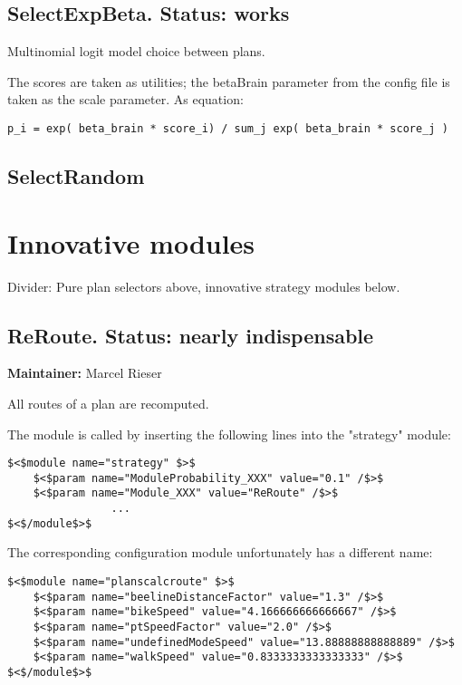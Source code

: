 \documentclass[a4paper,11pt]{report}
\begin{document}
\subsection{SelectExpBeta. Status: works}

Multinomial logit model choice between plans.

The scores are taken as utilities; the betaBrain parameter from the  config file is taken as the scale parameter. As equation:
\begin{verbatim}
p_i = exp( beta_brain * score_i) / sum_j exp( beta_brain * score_j )
\end{verbatim}

\subsection{SelectRandom}

\vfill\eject
\section{Innovative modules}


Divider: Pure plan selectors above, innovative strategy modules below.

\subsection{ReRoute.  Status: nearly indispensable}

\textbf{Maintainer:} Marcel Rieser

All routes of a plan are recomputed.

The module is called by inserting the following lines into the "strategy" module:
\begin{verbatim}
$<$module name="strategy" $>$
	$<$param name="ModuleProbability_XXX" value="0.1" /$>$
	$<$param name="Module_XXX" value="ReRoute" /$>$
                ...
$<$/module$>$
\end{verbatim}

The corresponding configuration module unfortunately has a different name:
\begin{verbatim}
$<$module name="planscalcroute" $>$
	$<$param name="beelineDistanceFactor" value="1.3" /$>$
	$<$param name="bikeSpeed" value="4.166666666666667" /$>$
	$<$param name="ptSpeedFactor" value="2.0" /$>$
	$<$param name="undefinedModeSpeed" value="13.88888888888889" /$>$
	$<$param name="walkSpeed" value="0.8333333333333333" /$>$
$<$/module$>$
\end{verbatim}
\end{document}
